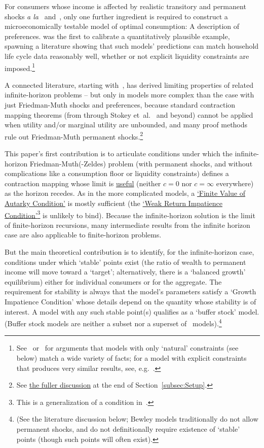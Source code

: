 \documentclass[BufferStockTheory]{subfiles}
\begin{document}
For consumers whose income is affected by realistic transitory and permanent shocks \textit{a la}~\cite{friedmanATheory} and~\cite{muthOptimal}, only one further ingredient is required to construct a microeconomically testable model of optimal consumption: A description of preferences.  \cite{zeldesStochastic} was the first to calibrate a quantitatively plausible example, spawning a literature showing that such models' predictions can match household life cycle data reasonably well, whether or not explicit liquidity constraints are imposed.\footnote{See~\cite{carrollBSLCPIH} or~\cite{gpLifeCycle} for arguments that models with only `natural' constraints (see below) match a wide variety of facts; for a model with explicit constraints that produces very similar results, see, e.g.~\cite{Cagetti}.}

A connected literature, starting with~\cite{bewleyPIH}, has derived limiting properties of related infinite-horizon problems -- but only in models more complex than the case with just Friedman-Muth shocks and preferences, because standard contraction mapping theorems (from \cite{bellmanDynamicProgramming} through Stokey et~al.~\citeyearpar{slpMethods} and beyond) cannot be applied when utility and/or marginal utility are unbounded, and many proof methods rule out Friedman-Muth permanent shocks.\footnote{See \hyperlink{DiffFromLit}{the fuller discussion} at the end of Section~\ref{subsec:Setup}.}

This paper's first contribution is to articulate conditions under which the infinite-horizon Friedman-Muth(-Zeldes) problem (with permanent shocks, and without complications like a consumption floor or liquidity constraints) defines a contraction mapping whose limit is \hyperlink{useful}{useful} (neither $c=0$ nor $c=\infty$ everywhere) as the horizon recedes.  As in the more complicated models, a \hyperlink{FVAC}{`Finite Value of Autarky Condition'} is mostly sufficient (the \hyperlink{WRIC}{`Weak Return Impatience Condition'}\footnote{This is a generalization of a condition in~\cite{mstIncFluct}.} is unlikely to bind).  Because the infinite-horizon solution is the limit of finite-horizon recursions, many intermediate results from the infinite horizon case are also applicable to finite-horizon problems.

But the main theoretical contribution is to identify, for the infinite-horizon case, conditions under which `stable' points exist (the ratio of wealth to permanent income will move toward a `target'; alternatively, there is a `balanced growth' equilibrium) either for individual consumers or for the aggregate.  The requirement for stability is always that the model's parameters satisfy a `Growth Impatience Condition' whose details depend on the quantity whose stability is of interest.  A model with any such stable point(s) qualifies as a `buffer stock' model.  (Buffer stock models are neither a subset nor a superset of~\cite{bewleyPIH} models).\footnote{(See the literature discussion below; Bewley models traditionally do not allow permanent shocks, and do not definitionally require existence of `stable' points (though such points will often exist).}
\end{document}
